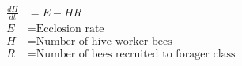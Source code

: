 \documentclass[varwidth=true, border=2pt]{standalone}
\begin{document}
\begin{align*}
\frac{dH}{dt} & = E - HR\nonumber \\
E & =  \text{Ecclosion rate} \nonumber \\
H & =  \text{Number of hive worker bees} \nonumber \\
R & =  \text{Number of bees recruited to forager class} \nonumber \\
\end{align*} 
\end{document}
